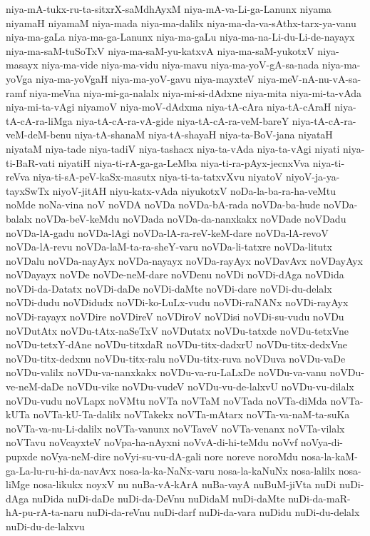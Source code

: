 {niya-mA-tukx-ru-ta-sitxrX-saMdhAyxM
niya-mA-va-Li-ga-Lanunx
niyama
niyamaH
niyamaM
niya-mada
niya-ma-dalilx
niya-ma-da-va-sAthx-tarx-ya-vanu
niya-ma-gaLa
niya-ma-ga-Lanunx
niya-ma-gaLu
niya-ma-na-Li-du-Li-de-nayayx
niya-ma-saM-tuSoTxV
niya-ma-saM-yu-katxvA
niya-ma-saM-yukotxV
niya-masayx
niya-ma-vide
niya-ma-vidu
niya-mavu
niya-ma-yoV-gA-sa-nada
niya-ma-yoVga
niya-ma-yoVgaH
niya-ma-yoV-gavu
niya-mayxteV
niya-meV-nA-nu-vA-sa-ramf
niya-meVna
niya-mi-ga-nalalx
niya-mi-si-dAdxne
niya-mita
niya-mi-ta-vAda
niya-mi-ta-vAgi
niyamoV
niya-moV-dAdxma
niya-tA-cAra
niya-tA-cAraH
niya-tA-cA-ra-liMga
niya-tA-cA-ra-vA-gide
niya-tA-cA-ra-veM-bareY
niya-tA-cA-ra-veM-deM-benu
niya-tA-shanaM
niya-tA-shayaH
niya-ta-BoV-jana
niyataH
niyataM
niya-tade
niya-tadiV
niya-tashacx
niya-ta-vAda
niya-ta-vAgi
niyati
niya-ti-BaR-vati
niyatiH
niya-ti-rA-ga-ga-LeMba
niya-ti-ra-pAyx-jecnxVva
niya-ti-reVva
niya-ti-sA-peV-kaSx-masutx
niya-ti-ta-tatxvXvu
niyatoV
niyoV-ja-ya-tayxSwTx
niyoV-jitAH
niyu-katx-vAda
niyukotxV
noDa-la-ba-ra-ha-veMtu
noMde
noNa-vina
noV
noVDA
noVDa
noVDa-bA-rada
noVDa-ba-hude
noVDa-balalx
noVDa-beV-keMdu
noVDada
noVDa-da-nanxkakx
noVDade
noVDadu
noVDa-lA-gadu
noVDa-lAgi
noVDa-lA-ra-reV-keM-dare
noVDa-lA-revoV
noVDa-lA-revu
noVDa-laM-ta-ra-sheY-varu
noVDa-li-tatxre
noVDa-litutx
noVDalu
noVDa-nayAyx
noVDa-nayayx
noVDa-rayAyx
noVDavAvx
noVDayAyx
noVDayayx
noVDe
noVDe-neM-dare
noVDenu
noVDi
noVDi-dAga
noVDida
noVDi-da-Datatx
noVDi-daDe
noVDi-daMte
noVDi-dare
noVDi-du-delalx
noVDi-dudu
noVDidudx
noVDi-ko-LuLx-vudu
noVDi-raNANx
noVDi-rayAyx
noVDi-rayayx
noVDire
noVDireV
noVDiroV
noVDisi
noVDi-su-vudu
noVDu
noVDutAtx
noVDu-tAtx-naSeTxV
noVDutatx
noVDu-tatxde
noVDu-tetxVne
noVDu-tetxY-dAne
noVDu-titxdaR
noVDu-titx-dadxrU
noVDu-titx-dedxVne
noVDu-titx-dedxnu
noVDu-titx-ralu
noVDu-titx-ruva
noVDuva
noVDu-vaDe
noVDu-valilx
noVDu-va-nanxkakx
noVDu-va-ru-LaLxDe
noVDu-va-vanu
noVDu-ve-neM-daDe
noVDu-vike
noVDu-vudeV
noVDu-vu-de-lalxvU
noVDu-vu-dilalx
noVDu-vudu
noVLapx
noVMtu
noVTa
noVTaM
noVTada
noVTa-diMda
noVTa-kUTa
noVTa-kU-Ta-dalilx
noVTakekx
noVTa-mAtarx
noVTa-va-naM-ta-suKa
noVTa-va-nu-Li-dalilx
noVTa-vanunx
noVTaveV
noVTa-venanx
noVTa-vilalx
noVTavu
noVcayxteV
noVpa-ha-nAyxni
noVvA-di-hi-teMdu
noVvf
noVya-di-pupxde
noVya-neM-dire
noVyi-su-vu-dA-gali
nore
noreve
noroMdu
nosa-la-kaM-ga-La-lu-ru-hi-da-navAvx
nosa-la-ka-NaNx-varu
nosa-la-kaNuNx
nosa-lalilx
nosa-liMge
nosa-likukx
noyxV
nu
nuBa-vA-kArA
nuBa-vayA
nuBuM-jiVta
nuDi
nuDi-dAga
nuDida
nuDi-daDe
nuDi-da-DeVnu
nuDidaM
nuDi-daMte
nuDi-da-maR-hA-pu-rA-ta-naru
nuDi-da-reVnu
nuDi-darf
nuDi-da-vara
nuDidu
nuDi-du-delalx
nuDi-du-de-lalxvu
}
